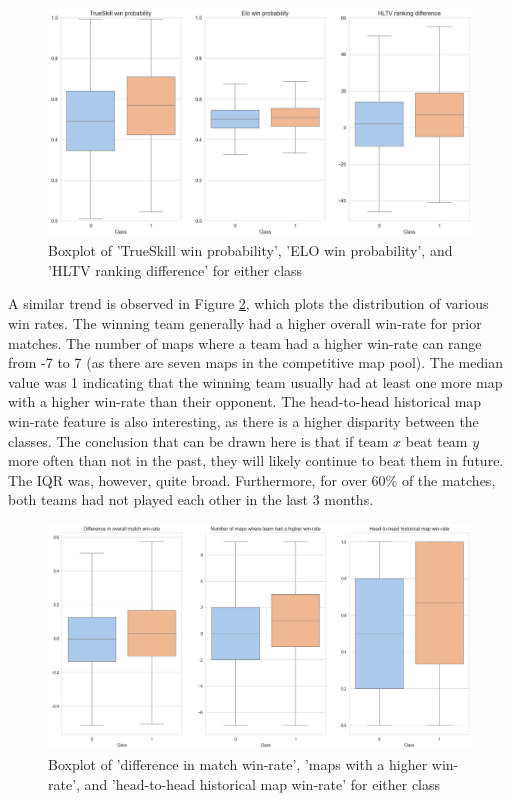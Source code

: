 \begin{figure}[h]
	\centering
	\begin{adjustbox}{center}
			\includegraphics[width=1.2\textwidth]{Figures/class-box-1.png}
	\end{adjustbox}
	\caption{Boxplot of 'TrueSkill win probability', 'ELO win probability', and 'HLTV ranking difference' for either class}
	\label{fig:win_prob_class_dist}
\end{figure}

A similar trend is observed in Figure \ref{fig:win_rate_class_dist}, which plots the distribution of various win rates. The winning team generally had a higher overall win-rate for prior matches. The number of maps where a team had a higher win-rate can range from -7 to 7 (as there are seven maps in the competitive map pool). The median value was 1 indicating that the winning team usually had at least one more map with a higher win-rate than their opponent. The head-to-head historical map win-rate feature is also interesting, as there is a higher disparity between the classes. The conclusion that can be drawn here is that if team $x$ beat team $y$ more often than not in the past, they will likely continue to beat them in future. The IQR was, however, quite broad. Furthermore, for over 60\% of the matches, both teams had not played each other in the last 3 months.

\begin{figure}[h]
	\centering
	\begin{adjustbox}{center}
		\includegraphics[width=1.2\textwidth]{Figures/class-box-2.png}
	\end{adjustbox}
	\caption{Boxplot of 'difference in match win-rate', 'maps with a higher win-rate', and 'head-to-head historical map win-rate' for either class}
	\label{fig:win_rate_class_dist}
\end{figure}

